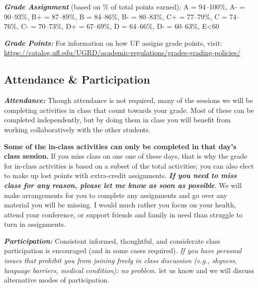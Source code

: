 \documentclass[
  10pt,
  letterpaper,
  oneside,
  open=any]{scrbook}
\begin{document}
\textbf{\emph{Grade Assignment}} (based on \% of total points earned): A
= 94--100\%, A- = 90--93\%, B+ = 87--89\%, B = 84--86\%, B- = 80--83\%,
C+ = 77--79\%, C = 74--76\%, C- = 70--73\%, D+ = 67--69\%, D = 64--66\%,
D- = 60--63\%, E\textless60

\textbf{\emph{Grade Points:}} For information on how UF assigns grade
points, visit:
\url{https://catalog.ufl.edu/UGRD/academic-regulations/grades-grading-policies/}

\subsection{Attendance \& Participation}\label{attendance-participation}

\textbf{\emph{Attendance:}} Though attendance is not required, many of
the sessions we will be completing activities in class that count
towards your grade. Most of these can be completed independently, but by
doing them in class you will benefit from working collaboratively with
the other students.

\textbf{Some of the in-class activities can only be completed in that
day's class session.} If you miss class on one one of these days, that
is why the grade for in-class activities is based on a subset of the
total activities; you can also elect to make up lost points with
extra-credit assignments. \textbf{\emph{If you need to miss class for
any reason, please let me know as soon as possible}}. We will make
arrangements for you to complete any assignments and go over any
material you will be missing. I would much rather you focus on your
health, attend your conference, or support friends and family in need
than struggle to turn in assignments.

\textbf{\emph{Participation:}} Consistent informed, thoughtful, and
considerate class participation is encouraged (and in some cases
required). \emph{If you have personal issues that prohibit you from
joining freely in class discussion (e.g., shyness, language barriers,
medical condition): no problem.} let us know and we will discuss
alternative modes of participation.
\end{document}
